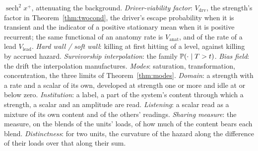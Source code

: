 $\operatorname{sech}^2x^+$, attenuating the background.
\emph{Driver-viability factor}: $V_{\mathrm{drv}}$, the strength's factor
in Theorem~\ref{thm:twocond}, the driver's escape probability when it is
transient and the indicator of a positive stationary mean when it is
positive recurrent; the same functional of an anatomy rate is
$V_{\mathrm{anat}}$, and of the rate of a lead $V_{\mathrm{lead}}$.
\emph{Hard wall / soft wall}: killing at
first hitting of a level, against killing by accrued hazard.
\emph{Survivorship interpolation}: the family
$\mathbb{P}(\cdot\mid T>t)$. \emph{Bias field}: the drift the interpolation
manufactures. \emph{Modes}: saturation, transformation, concentration,
the three limits of Theorem~\ref{thm:modes}. \emph{Domain}: a strength with a rate and a scalar of its own, developed at strength one or more and idle at or below zero. \emph{Institution}: a label, a part of the system's content through which a strength, a scalar and an amplitude are read. \emph{Listening}: a scalar read as a mixture of its own content and of the others' readings. \emph{Sharing measure}: the measure, on the blends of the units' loads, of how much of the content bears each blend. \emph{Distinctness}: for two units, the curvature of the hazard along the difference of their loads over that along their sum.
